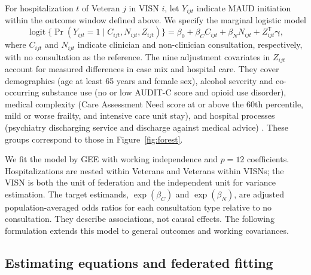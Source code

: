 \documentclass[12pt]{article}
\theoremstyle{remark}
\newcommand{\T}{\mathsf{T}}
\begin{document}
For hospitalization $t$ of Veteran $j$ in VISN $i$, let $Y_{ijt}$ indicate MAUD
initiation within the outcome window defined above. We specify the marginal
logistic model
\begin{equation}
\operatorname{logit}\{\Pr(Y_{ijt}=1\mid C_{ijt},N_{ijt},Z_{ijt})\}
=\beta_0+\beta_C C_{ijt}+\beta_N N_{ijt}+Z_{ijt}^{\T}\boldsymbol\gamma,
\label{eq:applicationmodel}
\end{equation}
where $C_{ijt}$ and $N_{ijt}$ indicate clinician and non-clinician consultation,
respectively, with no consultation as the reference. The nine adjustment
covariates in $Z_{ijt}$ account for measured differences in case mix and
hospital care. They cover demographics (age at least 65 years and female sex),
alcohol severity and co-occurring substance use (no or low AUDIT-C score and
opioid use disorder), medical complexity (Care Assessment Need score at or above
the 60th percentile, mild or worse frailty, and intensive care unit stay), and
hospital processes (psychiatry discharging service and discharge against
medical advice) \citep{anderson2026initiation}. These groups correspond to those
in Figure~\ref{fig:forest}.

We fit the model by GEE with working independence and $p=12$ coefficients.
Hospitalizations are nested within Veterans and Veterans within VISNs; the VISN
is both the unit of federation and the independent unit for variance estimation.
The target estimands, $\exp(\beta_C)$ and $\exp(\beta_N)$, are adjusted
population-averaged odds ratios for each consultation type relative to no
consultation. They describe associations, not causal effects. The following
formulation extends this model to general outcomes and working covariances.

\subsection{Estimating equations and federated fitting}
\label{sec:fitting}
\end{document}
